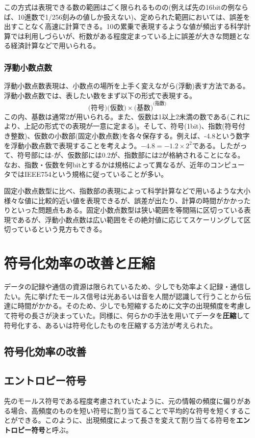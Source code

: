 この方式は表現できる数の範囲はごく限られるものの(例えば先の16bitの例ならば、10進数で1/256刻みの値しか扱えない)、定められた範囲においては、誤差を出すことなく高速に計算できる。10の累乗で表現するような値が頻出する科学計算では利用しづらいが、桁数がある程度定まっている上に誤差が大きな問題となる経済計算などで用いられる。

\subsubsection{浮動小数点数}
浮動小数点数表現は、小数点の場所を上手く変えながら(浮動)表す方法である。浮動小数点数では、表したい数をまず以下の形式で表現する。
\[\text{(符号)}\text{(仮数)}\times\text{(基数)}^\text{(指数)}\]
この内、基数は通常2が用いられる。また、仮数は1以上2未満の数である(これにより、上記の形式での表現が一意に定まる)。そして、符号(1bit)、指数(符号付き整数)、仮数の小数部(固定小数点数)を各々保存する。例えば、-4.8という数字を浮動小数点数で表現することを考えよう。$-4.8=-1.2\times 2^2$である。したがって、符号部には-が、仮数部には0.2が、指数部には2が格納されることになる。なお、指数・仮数を何bitとするかは規格によって異なるが、近年のコンピュータではIEEE754という規格に従っていることが多い。

固定小数点数型に比べ、指数部の表現によって科学計算などで用いるような大小様々な値に比較的近い値を表現できるが、誤差が出たり、計算の時間がかかったりといった問題点もある。固定小数点数型は狭い範囲を等間隔に区切っている表現であるが、浮動小数点数は広い範囲をその絶対値に応じてスケーリングして区切っているという見方もできる。


\section{符号化効率の改善と圧縮}
データの記録や通信の資源は限られているため、少しでも効率よく記録・通信したい。先に挙げたモールス信号は光あるいは音を人間が認識して行うことから伝達に時間がかかる。そのため、少しでも短縮するために文字の出現頻度を考慮して符号の長さが決まっていた。同様に、何らかの手法を用いてデータを\textbf{圧縮}して符号化する、あるいは符号化したものを圧縮する方法が考えられた。

\subsection{符号化効率の改善}

\subsection{エントロピー符号}
先のモールス符号である程度考慮されていたように、元の情報の頻度に偏りがある場合、高頻度のものを短い符号に割り当てることで平均的な符号を短くすることができる。このように、出現頻度によって長さを変えて割り当てる符号を\textbf{エントロピー符号}と呼ぶ。

